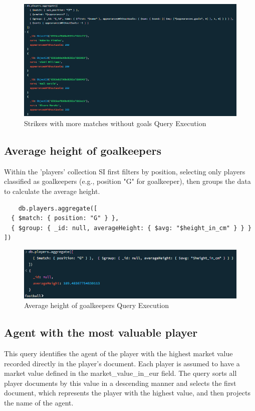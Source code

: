 \documentclass{Configuration_Files/PoliMi3i_thesis}
\begin{document}
\begin{figure}[htbp]
    \centering
    \includegraphics[scale=1]{Images/Queries/Strikers_without_goals/swg.png}
    \caption{Strikers with more matches without goals Query Execution}
\end{figure}
\newpage
\subsection{Average height of goalkeepers}
Within the 'players' collection SI first filters by position, selecting only players classified as goalkeepers (e.g., position "G" for goalkeeper), then groups the data to calculate the average height.
\begin{verbatim}
    db.players.aggregate([
  { $match: { position: "G" } },  
  { $group: { _id: null, averageHeight: { $avg: "$height_in_cm" } } }
])
\end{verbatim}

\begin{figure}[htbp]
    \centering
    \includegraphics[scale=1]{Images/Queries/Avg_goalkeepers_height/agh.png}
    \caption{Average height of goalkeepers Query Execution}
\end{figure}

\subsection{Agent with the most valuable player}
This query identifies the agent of the player with the highest market value recorded directly in the player's document. Each player is assumed to have a market value defined in the market\_value\_in\_eur field. The query sorts all player documents by this value in a descending manner and selects the first document, which represents the player with the highest value, and then projects the name of the agent.
\end{document}
